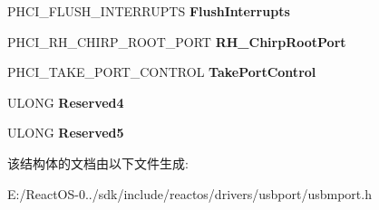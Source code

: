 \begin{DoxyCompactItemize}
P\+H\+C\+I\+\_\+\+F\+L\+U\+S\+H\+\_\+\+I\+N\+T\+E\+R\+R\+U\+P\+TS {\bfseries Flush\+Interrupts}
\item 
\mbox{\label{struct___u_s_b_p_o_r_t___r_e_g_i_s_t_r_a_t_i_o_n___p_a_c_k_e_t_acd24a73c7f48537ca122298b2b89c62d}} 
P\+H\+C\+I\+\_\+\+R\+H\+\_\+\+C\+H\+I\+R\+P\+\_\+\+R\+O\+O\+T\+\_\+\+P\+O\+RT {\bfseries R\+H\+\_\+\+Chirp\+Root\+Port}
\item 
\mbox{\label{struct___u_s_b_p_o_r_t___r_e_g_i_s_t_r_a_t_i_o_n___p_a_c_k_e_t_ae09330f565b45ee27e696a6506b675be}} 
P\+H\+C\+I\+\_\+\+T\+A\+K\+E\+\_\+\+P\+O\+R\+T\+\_\+\+C\+O\+N\+T\+R\+OL {\bfseries Take\+Port\+Control}
\item 
\mbox{\label{struct___u_s_b_p_o_r_t___r_e_g_i_s_t_r_a_t_i_o_n___p_a_c_k_e_t_ab70d3d5d240afabf44c7274d69651e88}} 
U\+L\+O\+NG {\bfseries Reserved4}
\item 
\mbox{\label{struct___u_s_b_p_o_r_t___r_e_g_i_s_t_r_a_t_i_o_n___p_a_c_k_e_t_ab32dc51f95cd67eb8084abd62629838c}} 
U\+L\+O\+NG {\bfseries Reserved5}
\end{DoxyCompactItemize}


该结构体的文档由以下文件生成\+:\begin{DoxyCompactItemize}
\item 
E\+:/\+React\+O\+S-\/0../sdk/include/reactos/drivers/usbport/usbmport.\+h\end{DoxyCompactItemize}
